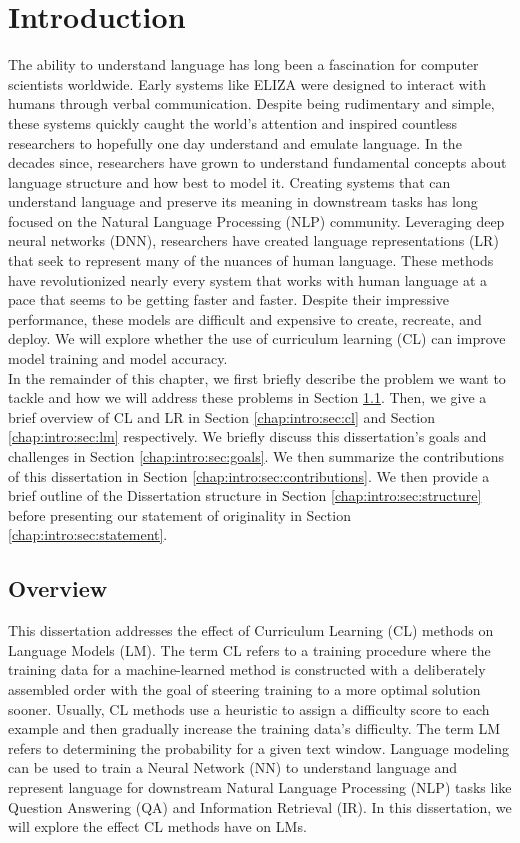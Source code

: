 \chapter {Introduction}
\label{chap:intro:sec:intro}
The ability to understand language has long been a fascination for computer scientists worldwide. Early systems like ELIZA \cite{Weizenbaum1966ELIZAA} were designed to interact with humans through verbal communication. Despite being rudimentary and simple, these systems quickly caught the world's attention and inspired countless researchers to hopefully one day understand and emulate language.  In the decades since, researchers have grown to understand fundamental concepts about language structure and how best to model it. Creating systems that can understand language and preserve its meaning in downstream tasks has long focused on the Natural Language Processing (NLP) community. Leveraging deep neural networks (DNN), researchers have created language representations (LR) that seek to represent many of the nuances of human language. These methods have revolutionized nearly every system that works with human language at a pace that seems to be getting faster and faster. Despite their impressive performance, these models are difficult and expensive to create, recreate, and deploy. We will explore whether the use of curriculum learning (CL) can improve model training and model accuracy.\\
In the remainder of this chapter, we first briefly describe the problem we want to tackle and how we will address these problems in Section \ref{chap:intro:sec:overview}. Then, we give a brief overview of CL and LR in Section \ref{chap:intro:sec:cl} and Section \ref{chap:intro:sec:lm} respectively. We briefly discuss this dissertation's goals and challenges in Section \ref{chap:intro:sec:goals}. We then summarize the contributions of this dissertation in Section \ref{chap:intro:sec:contributions}. We then provide a brief outline of the Dissertation structure in Section \ref{chap:intro:sec:structure} before presenting our statement of originality in Section \ref{chap:intro:sec:statement}.
\section{Overview}
\label{chap:intro:sec:overview}
This dissertation addresses the effect of Curriculum Learning (CL) methods on Language Models (LM). The term CL refers to a training procedure where the training data for a machine-learned method is constructed with a deliberately assembled order with the goal of steering training to a more optimal solution sooner. Usually, CL methods use a heuristic to assign a difficulty score to each example and then gradually increase the training data's difficulty. The term LM refers to determining the probability for a given text window. Language modeling can be used to train a Neural Network (NN) to understand language and represent language for downstream Natural Language Processing (NLP) tasks like Question Answering (QA) and Information Retrieval (IR). In this dissertation, we will explore the effect CL methods have on LMs.
